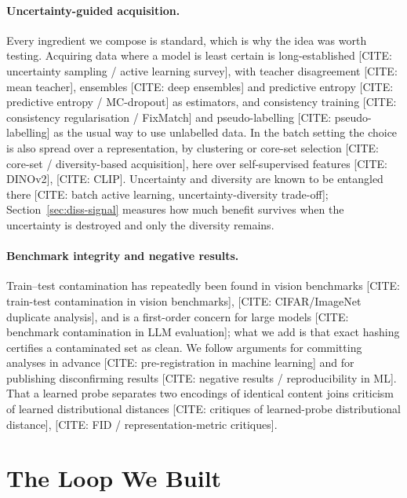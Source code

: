 \documentclass{article} %
\begin{document}
\paragraph{Uncertainty-guided acquisition.} Every ingredient we compose is standard, which is why the
idea was worth testing. Acquiring data where a model is least certain is long-established
[CITE: uncertainty sampling / active learning survey], with teacher disagreement [CITE: mean teacher],
ensembles [CITE: deep ensembles] and predictive entropy [CITE: predictive entropy / MC-dropout] as
estimators, and consistency training [CITE: consistency regularisation / FixMatch] and
pseudo-labelling [CITE: pseudo-labelling] as the usual way to use unlabelled data. In the batch
setting the choice is also spread over a representation, by clustering or core-set selection
[CITE: core-set / diversity-based acquisition], here over self-supervised features [CITE: DINOv2],
[CITE: CLIP]. Uncertainty and diversity are known to be entangled there
[CITE: batch active learning, uncertainty-diversity trade-off]; Section~\ref{sec:diss-signal}
measures how much benefit survives when the uncertainty is destroyed and only the diversity
remains.

\paragraph{Benchmark integrity and negative results.} Train--test contamination has repeatedly been
found in vision benchmarks [CITE: train-test contamination in vision benchmarks],
[CITE: CIFAR/ImageNet duplicate analysis], and is a first-order concern for large models
[CITE: benchmark contamination in LLM evaluation]; what we add is that exact hashing certifies a
contaminated set as clean. We follow arguments for committing analyses in advance
[CITE: pre-registration in machine learning] and for publishing disconfirming results
[CITE: negative results / reproducibility in ML]. That a learned probe separates two encodings of
identical content joins criticism of learned distributional distances
[CITE: critiques of learned-probe distributional distance],
[CITE: FID / representation-metric critiques].

\section{The Loop We Built}
\label{sec:method}
\end{document}
